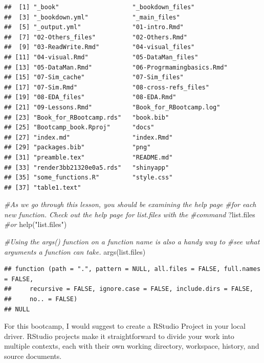 \documentclass[
]{book}
\newenvironment{Shaded}{\begin{snugshade}}{\end{snugshade}}
\newcommand{\CommentTok}[1]{\textcolor[rgb]{0.56,0.35,0.01}{\textit{#1}}}
\newcommand{\FunctionTok}[1]{\textcolor[rgb]{0.00,0.00,0.00}{#1}}
\newcommand{\NormalTok}[1]{#1}
\newcommand{\StringTok}[1]{\textcolor[rgb]{0.31,0.60,0.02}{#1}}
\begin{document}
\begin{verbatim}
##  [1] "_book"                    "_bookdown_files"         
##  [3] "_bookdown.yml"            "_main_files"             
##  [5] "_output.yml"              "01-intro.Rmd"            
##  [7] "02-Others_files"          "02-Others.Rmd"           
##  [9] "03-ReadWrite.Rmd"         "04-visual_files"         
## [11] "04-visual.Rmd"            "05-DataMan_files"        
## [13] "05-DataMan.Rmd"           "06-Progrmamingbasics.Rmd"
## [15] "07-Sim_cache"             "07-Sim_files"            
## [17] "07-Sim.Rmd"               "08-cross-refs_files"     
## [19] "08-EDA_files"             "08-EDA.Rmd"              
## [21] "09-Lessons.Rmd"           "Book_for_RBootcamp.log"  
## [23] "Book_for_RBootcamp.rds"   "book.bib"                
## [25] "Bootcamp_book.Rproj"      "docs"                    
## [27] "index.md"                 "index.Rmd"               
## [29] "packages.bib"             "png"                     
## [31] "preamble.tex"             "README.md"               
## [33] "render3bb21320e0a5.rds"   "shinyapp"                
## [35] "some_functions.R"         "style.css"               
## [37] "table1.text"
\end{verbatim}

\begin{Shaded}
\begin{Highlighting}[]
\CommentTok{\#As we go through this lesson, you should be examining the help page }
\CommentTok{\#for each new function. Check out the help page for list.files with the}
\CommentTok{\#command}
\NormalTok{?list.files}
\CommentTok{\#or}
\FunctionTok{help}\NormalTok{(}\StringTok{"list.files"}\NormalTok{)}

\CommentTok{\#Using the args() function on a function name is also a handy way to }
\CommentTok{\#see what arguments a function can take.}
\FunctionTok{args}\NormalTok{(list.files)}
\end{Highlighting}
\end{Shaded}

\begin{verbatim}
## function (path = ".", pattern = NULL, all.files = FALSE, full.names = FALSE, 
##     recursive = FALSE, ignore.case = FALSE, include.dirs = FALSE, 
##     no.. = FALSE) 
## NULL
\end{verbatim}

For this bootcamp, I would suggest to create a RStudio Project in your local driver. RStudio projects make it straightforward to divide your work into multiple contexts, each with their own working directory, workspace, history, and source documents.
\end{document}
